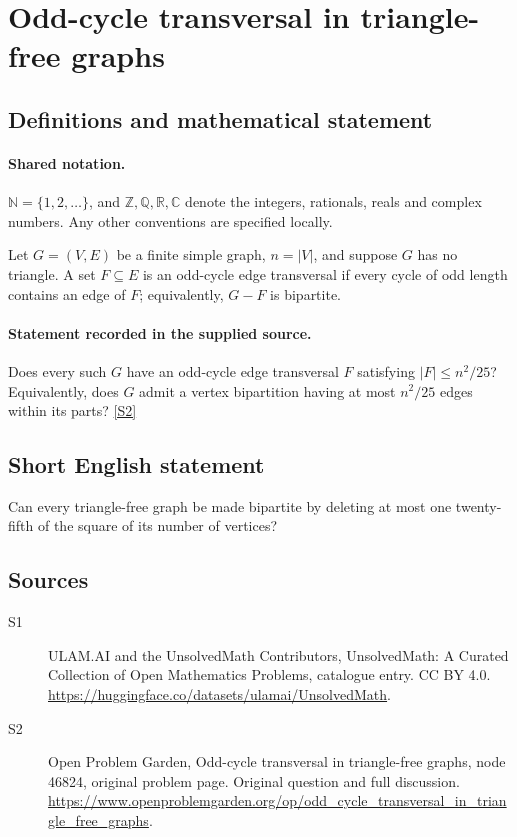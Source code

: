 \documentclass[11pt]{article}
\newcommand{\sref}[2]{\hyperlink{source:#1:#2}{[S#2]}}
\begin{document}
\section{Odd-cycle transversal in triangle-free graphs}\label{statement}

\subsection{Definitions and mathematical statement}

\paragraph{Shared notation.}$\mathbb N=\{1,2,\ldots\}$, and $\mathbb Z,\mathbb Q,\mathbb R,\mathbb C$ denote the integers, rationals, reals and complex numbers. Any other conventions are specified locally.


Let $G=(V,E)$ be a finite simple graph, $n=|V|$, and suppose $G$ has no triangle. A set $F\subseteq E$ is an odd-cycle edge transversal if every cycle of odd length contains an edge of $F$; equivalently, $G-F$ is bipartite.
\paragraph{Statement recorded in the supplied source.}
Does every such $G$ have an odd-cycle edge transversal $F$ satisfying $|F|\leq n^2/25$? Equivalently, does $G$ admit a vertex bipartition having at most $n^2/25$ edges within its parts? \sref{statement}{2}
\subsection{Short English statement}
Can every triangle-free graph be made bipartite by deleting at most one twenty-fifth of the square of its number of vertices?
\subsection{Sources}
\begin{description}
\item[\hypertarget{source:statement:1}{S1}] ULAM.AI and the UnsolvedMath Contributors, UnsolvedMath: A Curated Collection of Open Mathematics Problems, catalogue entry. CC BY 4.0. \url{https://huggingface.co/datasets/ulamai/UnsolvedMath}.
\item[\hypertarget{source:statement:2}{S2}] Open Problem Garden, Odd-cycle transversal in triangle-free graphs, node 46824, original problem page. Original question and full discussion. \url{https://www.openproblemgarden.org/op/odd_cycle_transversal_in_triangle_free_graphs}.

\end{description}
\label{end:statement}
\end{document}

